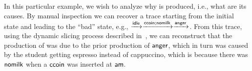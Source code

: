 In this particular example, we wish to analyze why \bang is produced, i.e., what are its causes. By manual inspection we can recover a trace starting from the initial state and leading to the ``bad'' state, e.g., $\xrightarrow{{\text{\sffamily idle}}}\xrightarrow{{\text{\sffamily ccoin}};{\text{\sffamily nomilk}}}\xrightarrow{{\text{\sffamily anger}}}$. From this trace, using the dynamic slicing process described in~\cite{DBLP:journals/nc/BrodoBF24}, we can reconstruct that the production of \bang was due to the prior production of ${\text{\sffamily anger}}$, which in turn was caused by the student getting espresso instead of cappuccino, which is because there was ${\text{\sffamily nomilk}}$ when a ${\text{\sffamily ccoin}}$ was inserted at ${\text{\sffamily am}}$.
